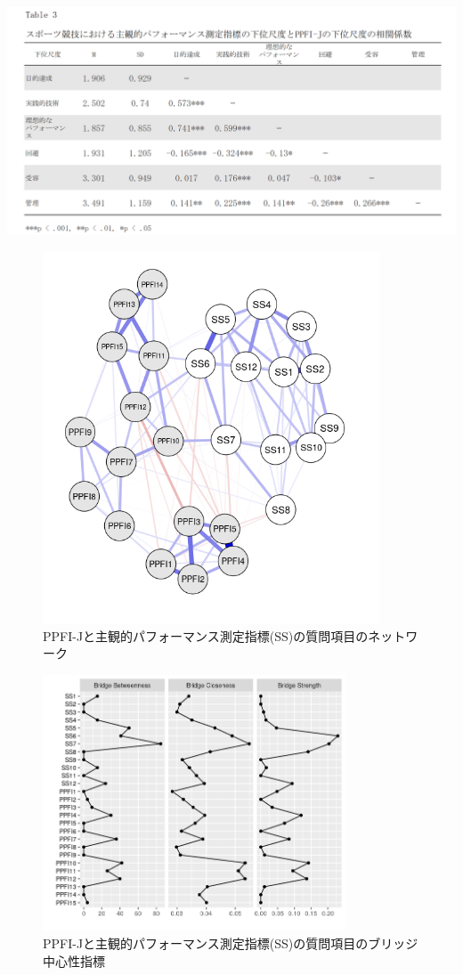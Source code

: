 \documentclass[12pt,a4paper,xelatex,ja=standard]{bxjsarticle}
\begin{document}
\includegraphics{table3.png}

\setcounter{figure}{1} 
\begin{figure}[H]
\centering
\includegraphics[clip,width = 10cm]{SS-PPFI.png}
\caption{PPFI-Jと主観的パフォーマンス測定指標(SS)の質問項目のネットワーク}
\end{figure}

\begin{figure}[H]
\centering
\includegraphics[clip,width = 9cm]{ss-ppfi_B.png}
\caption{PPFI-Jと主観的パフォーマンス測定指標(SS)の質問項目のブリッジ中心性指標}
\end{figure}
\end{document}
